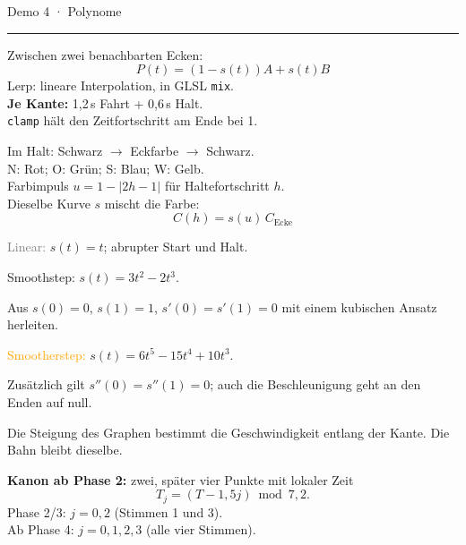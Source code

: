 \documentclass[12pt,a4paper,landscape]{article}
\renewcommand{\large}{\fontsize{18}{22}\selectfont}
\renewcommand{\LARGE}{\fontsize{24}{29}\selectfont}
\renewcommand{\small}{\fontsize{13}{16}\selectfont}
\newcommand{\kopf}[2]{\noindent{\LARGE\bfseries #1}\hfill{\large #2}\par\vspace{2mm}\hrule\vspace{4mm}}
\begin{document}
\kopf{6 · Sanft bremsen und anfahren}{Demo 4 · Polynome}
\begin{minipage}[t]{.47\textwidth}\vspace{0pt}
\begin{center}
\end{center}
Zwischen zwei benachbarten Ecken:
\[P(t)=(1-s(t))A+s(t)B\]
Lerp: lineare Interpolation, in GLSL \texttt{mix}.\\
\textbf{Je Kante:} 1,2\,s Fahrt + 0,6\,s Halt.\\
\texttt{clamp} hält den Zeitfortschritt am Ende bei 1.\par\smallskip
{\small Im Halt: Schwarz $\to$ Eckfarbe $\to$ Schwarz.\\
N: Rot; O: Grün; S: Blau; W: Gelb.\\
Farbimpuls $u=1-|2h-1|$ für Haltefortschritt $h$.\\
Dieselbe Kurve $s$ mischt die Farbe:
\[C(h)=s(u)\,C_{\text{Ecke}}\]}

\end{minipage}\hfill
\begin{minipage}[t]{.50\textwidth}\vspace{0pt}
\begin{center}
\end{center}
{\small
\textcolor{gray}{Linear:} $s(t)=t$; abrupter Start und Halt.\par\smallskip
\textcolor{petrol}{Smoothstep:} $s(t)=3t^2-2t^3$.\par
Aus $s(0)=0$, $s(1)=1$, $s'(0)=s'(1)=0$ mit einem kubischen Ansatz herleiten.\par\smallskip
\textcolor{orange}{Smootherstep:} $s(t)=6t^5-15t^4+10t^3$.\par
Zusätzlich gilt $s''(0)=s''(1)=0$; auch die Beschleunigung geht an den Enden auf null.\par\smallskip
Die Steigung des Graphen bestimmt die Geschwindigkeit entlang der Kante. Die Bahn bleibt dieselbe.
\par\smallskip
\textbf{Kanon ab Phase 2:} zwei, später vier Punkte mit lokaler Zeit
\[T_j=(T-1{,}5j)\bmod 7{,}2.\]
Phase 2/3: $j=0,2$ (Stimmen 1 und 3).\\
Ab Phase 4: $j=0,1,2,3$ (alle vier Stimmen).
}
\end{minipage}
\end{document}
